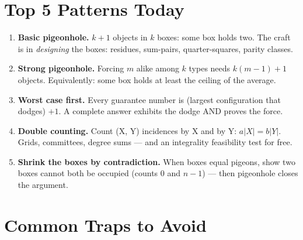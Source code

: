 \documentclass[11pt,a4paper]{article}
\begin{document}
\section*{Top 5 Patterns Today}

\begin{enumerate}[leftmargin=2em, itemsep=4pt]
  \item \textbf{Basic pigeonhole.} $k+1$ objects in $k$ boxes: some box holds two. The craft is in \emph{designing} the boxes: residues, sum-pairs, quarter-squares, parity classes. 
  \item \textbf{Strong pigeonhole.} Forcing $m$ alike among $k$ types needs $k(m-1)+1$ objects. Equivalently: some box holds at least the ceiling of the average. 
  \item \textbf{Worst case first.} Every guarantee number is (largest configuration that dodges) $+1$. A complete answer exhibits the dodge AND proves the force. 
  \item \textbf{Double counting.} Count (X, Y) incidences by X and by Y: $a|X|=b|Y|$. Grids, committees, degree sums --- and an integrality feasibility test for free. 
  \item \textbf{Shrink the boxes by contradiction.} When boxes equal pigeons, show two boxes cannot both be occupied (counts 0 and $n-1$) --- then pigeonhole closes the argument. 
\end{enumerate}

\section*{Common Traps to Avoid}
\end{document}
